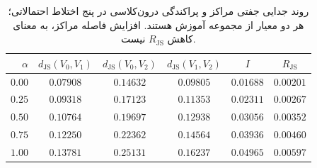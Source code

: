 \begin{table}[htbp]
\centering\small
\caption{روند جدایی جفتی مراکز و پراکندگی درون‌کلاسی در پنج اختلاط احتمالاتی؛ هر دو معیار از مجموعه آموزش هستند. افزایش فاصله مراکز، به معنای کاهش $R_{\mathrm{JS}}$ نیست.}
\label{tab:ch4-guided-mixture-center-distances}
\begin{tabular}{rccccc}\hline
$\alpha$ & $d_{\mathrm{JS}}(V_0,V_1)$ & $d_{\mathrm{JS}}(V_0,V_2)$ & $d_{\mathrm{JS}}(V_1,V_2)$ & $I$ & $R_{\mathrm{JS}}$\\\hline
$0.00$ & $0.07908$ & $0.14632$ & $0.09805$ & $0.01688$ & $0.00201$ \\
$0.25$ & $0.09318$ & $0.17123$ & $0.11353$ & $0.02311$ & $0.00267$ \\
$0.50$ & $0.10764$ & $0.19697$ & $0.12938$ & $0.03056$ & $0.00352$ \\
$0.75$ & $0.12250$ & $0.22362$ & $0.14564$ & $0.03936$ & $0.00460$ \\
$1.00$ & $0.13781$ & $0.25131$ & $0.16237$ & $0.04965$ & $0.00597$ \\
\hline
\end{tabular}
\end{table}
